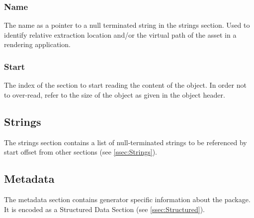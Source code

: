 {	\subsubsection{Name}
	The name as a pointer to a null terminated string in the strings section. Used to identify relative extraction location and/or the virtual path of the asset in a rendering application.

	\subsubsection{Start}
	The index of the section to start reading the content of the object. In order not to over-read, refer to the size of the object as given in the object header.
}

\subsection{Strings}
The strings section contains a list of null-terminated strings to be referenced by start offset from other sections (see \ref{ssec:Strings}).

\subsection{Metadata}
The metadata section contains generator specific information about the package. It is encoded as a Structured Data Section (see \ref{ssec:Structured}).
